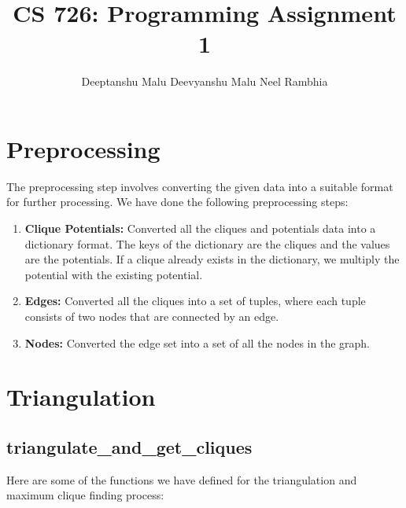 \documentclass[12pt]{article}
\title{CS 726: Programming Assignment 1}
\author{Deeptanshu Malu \quad Deevyanshu Malu \quad Neel Rambhia}
\date{}
\begin{document}
\maketitle

\section{Preprocessing}

The preprocessing step involves converting the given data into a suitable format for further processing. We have done the following preprocessing steps:

\begin{enumerate}
    \item \textbf{Clique Potentials:} Converted all the cliques and potentials data into a dictionary format. The keys of the dictionary are the cliques and the values are the potentials. If a clique already exists in the dictionary, we multiply the potential with the existing potential.
    \item \textbf{Edges:} Converted all the cliques into a set of tuples, where each tuple consists of two nodes that are connected by an edge.
    \item \textbf{Nodes:} Converted the edge set into a set of all the nodes in the graph.
\end{enumerate}

\section{Triangulation}

\subsection{triangulate\_and\_get\_cliques}
Here are some of the functions we have defined for the triangulation and maximum clique finding process:
\end{document}
